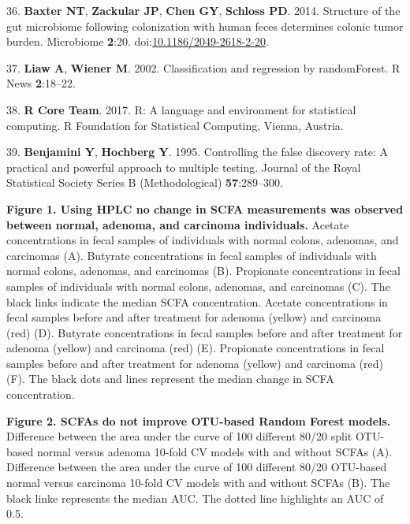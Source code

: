 \documentclass[11pt,]{article}
\begin{document}
\hypertarget{ref-scfa_baxter2014}{}
36. \textbf{Baxter NT}, \textbf{Zackular JP}, \textbf{Chen GY},
\textbf{Schloss PD}. 2014. Structure of the gut microbiome following
colonization with human feces determines colonic tumor burden.
Microbiome \textbf{2}:20.
doi:\href{https://doi.org/10.1186/2049-2618-2-20}{10.1186/2049-2618-2-20}.

\hypertarget{ref-randomforest_citation_2002}{}
37. \textbf{Liaw A}, \textbf{Wiener M}. 2002. Classification and
regression by randomForest. R News \textbf{2}:18--22.

\hypertarget{ref-r_citation_2017}{}
38. \textbf{R Core Team}. 2017. R: A language and environment for
statistical computing. R Foundation for Statistical Computing, Vienna,
Austria.

\hypertarget{ref-benjamini_controlling_1995}{}
39. \textbf{Benjamini Y}, \textbf{Hochberg Y}. 1995. Controlling the
false discovery rate: A practical and powerful approach to multiple
testing. Journal of the Royal Statistical Society Series B
(Methodological) \textbf{57}:289--300.

\newpage

\textbf{Figure 1. Using HPLC no change in SCFA measurements was observed
between normal, adenoma, and carcinoma individuals.} Acetate
concentrations in fecal samples of individuals with normal colons,
adenomas, and carcinomas (A). Butyrate concentrations in fecal samples
of individuals with normal colons, adenomas, and carcinomas (B).
Propionate concentrations in fecal samples of individuals with normal
colons, adenomas, and carcinomas (C). The black links indicate the
median SCFA concentration. Acetate concentrations in fecal samples
before and after treatment for adenoma (yellow) and carcinoma (red) (D).
Butyrate concentrations in fecal samples before and after treatment for
adenoma (yellow) and carcinoma (red) (E). Propionate concentrations in
fecal samples before and after treatment for adenoma (yellow) and
carcinoma (red) (F). The black dots and lines represent the median
change in SCFA concentration.

\textbf{Figure 2. SCFAs do not improve OTU-based Random Forest models.}
Difference between the area under the curve of 100 different 80/20 split
OTU-based normal versus adenoma 10-fold CV models with and without SCFAs
(A). Difference between the area under the curve of 100 different 80/20
OTU-based normal versus carcinoma 10-fold CV models with and without
SCFAs (B). The black linke represents the median AUC. The dotted line
highlights an AUC of 0.5.
\end{document}
